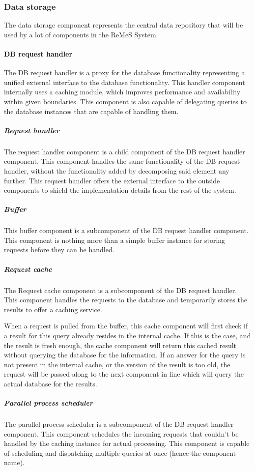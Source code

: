 \subsubsection{Data storage}
The data storage component represents the central data repository that will be used by a lot of components in the ReMeS System.

\paragraph{DB request handler} 
The DB request handler is a proxy for the database functionality representing a unified external interface to the database functionality.
This handler component internally uses a caching module, which improves performance and availability within given boundaries.
This component is also capable of delegating queries to the database instances that are capable of handling them.

\subparagraph{Request handler}
The request handler component is a child component of the DB request handler component. This component
handles the same functionality of the DB request handler, without the functionality added by decomposing said element any further. This request handler offers the external interface to the outside components to shield the implementation details from the rest of the system.
\subparagraph{Buffer}
This buffer component is a subcomponent of the DB request handler component. This component is nothing more than a simple buffer instance for storing requests before they can be handled.
\subparagraph{Request cache}
The Request cache component is a subcomponent of the DB request handler. This component handles the requests to the database and temporarily stores the results to offer a caching service. 

When a request is pulled from the buffer, this cache component will first check if a result for this query already resides in the internal cache. 
If this is the case, and the result is fresh enough, the cache component will return this cached result without querying the database for the information. 
If an answer for the query is not present in the internal cache, or the version of the result is too old, the request will be passed along to the next component in line which will query the actual database for the results.

\subparagraph{Parallel process scheduler}
The parallel process scheduler is a subcomponent of the DB request handler component. This component schedules the incoming requests that couldn't be handled by the caching instance for actual processing. This component is capable of scheduling and dispatching multiple queries at once (hence the component name).
